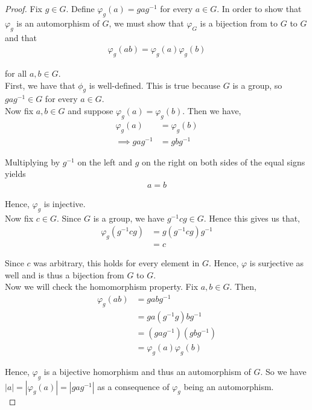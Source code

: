 \documentclass[11pt, reqno]{amsart}
\theoremstyle{plain}
\theoremstyle{definition}
\theoremstyle{example}
\begin{document}
\begin{proof}
Fix $g \in G$. Define $\varphi_g(a) = gag^{-1}$ for every $a \in G$. In order to show that $\varphi_g$ is an automorphism of $G$, we must show that $\varphi_G$ is a bijection from to $G$ to $G$ and that
\begin{align*}
\varphi_g(ab) = \varphi_g(a)\varphi_g(b)
\end{align*}

for all $a, b \in G$.\\

First, we have that $\phi_g$ is well-defined. This is true because $G$ is a group, so $gag^{-1} \in G$ for every $a \in G$.\\

Now fix $a, b \in G$ and suppose $\varphi_g(a) = \varphi_g(b)$. Then we have,
\begin{align*}
\varphi_g(a) &= \varphi_g(b)\\
\implies gag^{-1} &= gbg^{-1}
\end{align*}

Multiplying by $g^{-1}$ on the left and $g$ on the right on both sides of the equal signs yields
\begin{align*}
a = b
\end{align*}

Hence, $\varphi_g$ is injective.\\

Now fix $c \in G$. Since $G$ is a group, we have $g^{-1}cg \in G$. Hence this gives us that,
\begin{align*}
\varphi_g(g^{-1}cg) &= g(g^{-1}cg)g^{-1}\\
&= c
\end{align*}

Since $c$ was arbitrary, this holds for every element in $G$. Hence, $\varphi$ is surjective as well and is thus a bijection from $G$ to $G$.\\

Now we will check the homomorphism property. Fix $a, b \in G$. Then,
\begin{align*}
\varphi_g(ab) &= gabg^{-1}\\
&= ga(g^{-1}g)bg^{-1}\\
&= (gag^{-1})(gbg^{-1})\\
&= \varphi_g(a)\varphi_g(b)
\end{align*}

Hence, $\varphi_g$ is a bijective homorphism and thus an automorphism of $G$. So we have $|a| = |\varphi_g(a)| = |gag^{-1}|$ as a consequence of $\varphi_g$ being an automorphism.\\


\end{proof}
\end{document}
